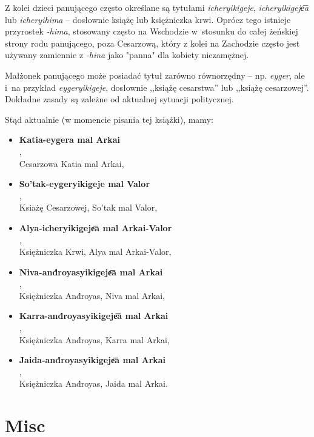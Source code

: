 Z kolei dzieci panującego często określane są tytułami \emph{icheryikigeje},
\emph{icheryikigeje͞a} lub \emph{icheryihima} -- dosłownie książę lub
księżniczka krwi. Oprócz tego istnieje przyrostek \emph{-hima}, stosowany często
na Wschodzie w~stosunku do całej żeńskiej strony rodu panującego, poza
Cesarzową, który z kolei na Zachodzie często jest używany zamiennie z
\emph{-hina} jako "panna" dla kobiety niezamężnej.

Małżonek panującego może posiadać tytuł zarówno równorzędny -- np. \emph{eyger},
ale i~na przykład \emph{eygeryikigeje}, dosłownie ,,książę cesarstwa'' lub
,,książę cesarzowej''. Dokładne zasady są zależne od aktualnej sytuacji
politycznej.

Stąd aktualnie (w momencie pisania tej książki), mamy:

\begin{itemize}
    \item \textbf{Katia-eygera mal Arkai}\\ ,\\
          Cesarzowa Katia mal Arkai,
    \item \textbf{So'tak-eygeryikigeje mal Valor}\\ ,\\ Ksiażę Cesarzowej, So'tak mal Valor,
    \item \textbf{Alya-icheryikigeje͞a mal Arkai-Valor}\\,\\ Księżniczka Krwi, Alya mal Arkai-Valor,
    \item \textbf{Niva-and́royasyikigeje͞a mal Arkai}\\,\\ Księżniczka And́royas, Niva mal Arkai,
    \item \textbf{Karra-and́royasyikigeje͞a mal Arkai}\\,\\ Księżniczka And́royas, Karra mal Arkai,
    \item \textbf{Jaida-and́royasyikigeje͞a mal Arkai}\\,\\ Księżniczka And́royas, Jaida mal Arkai.
\end{itemize}


\section{Misc}

